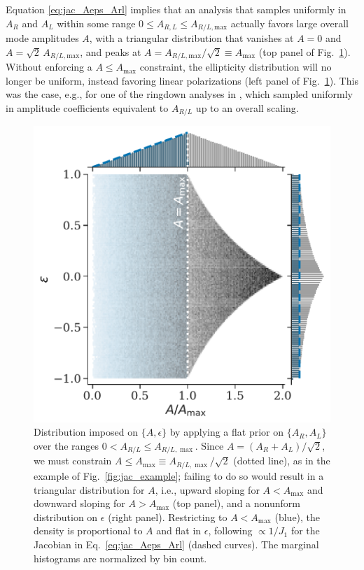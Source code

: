 \documentclass[aps,prd,twocolumn,superscriptaddress,preprintnumbers,floatfix,nofootinbib]{revtex4-2}
\newcommand*{\eq}[1]{Eq.~\eqref{eq:#1}}
\begin{document}
Equation \eqref{eq:jac_Aeps_Arl} implies that an analysis that samples uniformly in $A_R$ and $A_L$ within some range $0 \leq A_{R,L} \leq A_{R/L,\mathrm{max}}$ actually favors large overall mode amplitudes $A$, with a triangular distribution that vanishes at $A=0$ and $A=\sqrt{2}\,A_{R/L,\mathrm{max}}$, and peaks at $A = A_{R/L,\mathrm{max}}/\sqrt{2} \equiv A_{\max}$ (top panel of Fig.~\ref{fig:jac_Aeps_Arl}).
Without enforcing a $A \leq A_{\max}$ constraint, the ellipticity distribution will no longer be uniform, instead favoring linear polarizations (left panel of Fig.~\ref{fig:jac_Aeps_Arl}).
This was the case, e.g., for one of the ringdown analyses in \cite{LIGOScientific:2020tif}, which sampled uniformly in amplitude coefficients equivalent to $A_{R/L}$ up to an overall scaling.

\begin{figure}
\includegraphics[width=0.8\columnwidth]{jac_Aeps_Arl}
\caption{Distribution imposed on $\{A,\epsilon\}$ by applying a flat prior on $\{A_R,A_L\}$ over the ranges $0 < A_{R/L} \leq A_{R/L,\max}$.
Since $A = (A_R + A_L)/\sqrt{2}$, we must constrain $A \leq A_{\max} \equiv A_{R/L,\max}/\sqrt{2}$ (dotted line), as in the example of Fig.~\ref{fig:jac_example};
failing to do so would result in a triangular distribution for $A$, i.e., upward sloping for $A < A_{\max}$ and downward sloping for $A > A_{\max}$ (top panel), and a nonunform distribution on $\epsilon$ (right panel).
Restricting to $A < A_{\max}$ (blue), the density is proportional to $A$ and flat in $\epsilon$, following $\propto 1/J_1$ for the Jacobian in \eq{jac_Aeps_Arl} (dashed curves).
The marginal histograms are normalized by bin count.
}
\label{fig:jac_Aeps_Arl}
\end{figure}
\end{document}
